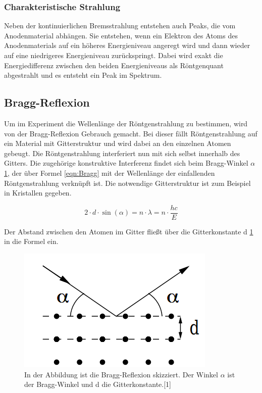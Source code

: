 \documentclass[titlepage = firstcover]{scrartcl}
\begin{document}
            \subsubsection*{Charakteristische Strahlung}
                Neben der kontinuierlichen Bremsstrahlung entstehen auch Peaks, die vom Anodenmaterial abhängen. Sie entstehen, wenn ein Elektron des Atoms des Anodenmaterials 
                auf ein höheres Energieniveau angeregt wird und dann wieder auf eine niedrigeres Energieniveau zurückspringt. Dabei wird exakt die 
                Energiedifferenz zwischen den beiden Energieniveaus als Röntgenquant abgestrahlt und es entsteht ein Peak im Spektrum.
                
        \subsection{Bragg-Reflexion}
        Um im Experiment die Wellenlänge der Röntgenstrahlung zu bestimmen, wird von der Bragg-Reflexion Gebrauch gemacht. Bei dieser fällt Röntgenstrahlung
        auf ein Material mit Gitterstruktur und wird dabei an den einzelnen Atomen gebeugt. Die Röntgenstrahlung interferiert nun mit sich selbst innerhalb 
        des Gitters. Die zugehörige konstruktive Interferenz findet sich beim Bragg-Winkel $\alpha $ \ref{fig:SkizzeBragg}, der über Formel \ref{eqn:Bragg} 
        mit der Wellenlänge der einfallenden Röntgenstrahlung verknüpft ist. Die notwendige Gitterstruktur ist zum Beispiel in Kristallen gegeben.

        \begin{equation}
            2 \cdot d \cdot \sin(\alpha) = n \cdot \lambda = n \cdot \frac{hc}{E}
            \label{eqn:Bragg}
        \end{equation}

        \noindent
        Der Abstand zwischen den Atomen im Gitter fließt über die Gitterkonstante d \ref{fig:SkizzeBragg} in die Formel ein.
        
        \FloatBarrier
        \begin{figure}[h]
            \centering
            \includegraphics[width = 0.8\linewidth]{Bragg.png}
            \caption{In der Abbildung ist die Bragg-Reflexion skizziert. Der Winkel $\alpha$ ist der Bragg-Winkel und d die Gitterkonstante.[1]}
            \label{fig:SkizzeBragg}
        \end{figure}
        \FloatBarrier
\end{document}
